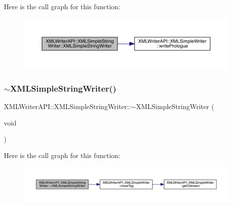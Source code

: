 Here is the call graph for this function\+:
\nopagebreak
\begin{figure}[H]
\begin{center}
\leavevmode
\includegraphics[width=350pt]{da/dec/classXMLWriterAPI_1_1XMLSimpleStringWriter_a7caa663dd64c87fa0eabc563154143a5_cgraph}
\end{center}
\end{figure}
\mbox{\label{classXMLWriterAPI_1_1XMLSimpleStringWriter_a10b08cc22793241a637eefa425e0ebe5}} 
\subsubsection{\texorpdfstring{$\sim$XMLSimpleStringWriter()}{~XMLSimpleStringWriter()}\hspace{0.1cm}{\footnotesize\ttfamily [3/3]}}
{\footnotesize\ttfamily X\+M\+L\+Writer\+A\+P\+I\+::\+X\+M\+L\+Simple\+String\+Writer\+::$\sim$\+X\+M\+L\+Simple\+String\+Writer (\begin{DoxyParamCaption}\item[{void}]{ }\end{DoxyParamCaption})\hspace{0.3cm}{\ttfamily [inline]}}

Here is the call graph for this function\+:
\nopagebreak
\begin{figure}[H]
\begin{center}
\leavevmode
\includegraphics[width=350pt]{da/dec/classXMLWriterAPI_1_1XMLSimpleStringWriter_a10b08cc22793241a637eefa425e0ebe5_cgraph}
\end{center}
\end{figure}


